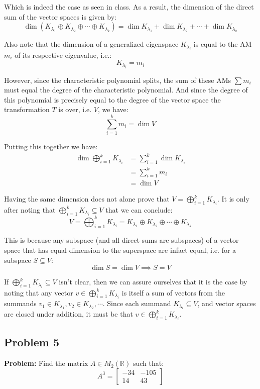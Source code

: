 \documentclass{article}
\begin{document}
Which is indeed the case as seen in class. As a result, the dimension of the direct sum of the vector spaces is given by:
$$\operatorname{dim}(K_{\lambda_1}\oplus K_{\lambda_2}\oplus\cdots\oplus K_{\lambda_k})=\operatorname{dim}K_{\lambda_1}+\operatorname{dim}K_{\lambda_2}+\cdots+\operatorname{dim}K_{\lambda_k}$$

Also note that the dimension of a generalized eigenspace $K_{\lambda_i}$ is equal to the AM $m_i$ of its respective eigenvalue, i.e.:
$$K_{\lambda_i}=m_i$$

However, since the characteristic polynomial splits, the sum of these AMs $\sum m_i$ must equal the degree of the characteristic polynomial. And since the degree of this polynomial is precisely equal to the degree of the vector space the transformation $T$ is over, i.e. $V$, we have:
$$\sum_{i=1}^k m_i=\operatorname{dim}V$$

Putting this together we have:
\begin{align*}
  \operatorname{dim}\bigoplus_{i=1}^k K_{\lambda_i}&=\sum_{i=1}^k\operatorname{dim}K_{\lambda_i}\tag{dimension of direct sum}\\
  &=\sum_{i=1}^k m_i\tag{dim of generalized eigenspace}\\
  &=\operatorname{dim}V\tag{char. polynomial splits}
\end{align*}

Having the same dimension does not alone prove that $V=\bigoplus_{i=1}^k K_{\lambda_i}$. It is only after noting that $\bigoplus_{i=1}^k K_{\lambda_i}\subseteq V$ that we can conclude:
$$V=\bigoplus_{i=1}^k K_{\lambda_i}=K_{\lambda_1}\oplus K_{\lambda_2}\oplus\cdots\oplus K_{\lambda_k}$$

This is because any subspace (and all direct sums are subspaces) of a vector space that has equal dimension to the superspace are infact equal, i.e. for a subspace $S\subseteq V$:
$$\operatorname{dim}S=\operatorname{dim}V\implies S=V$$ 

If $\bigoplus_{i=1}^k K_{\lambda_i}\subseteq V$ isn't clear, then we can assure ourselves that it is the case by noting that any vector $v\in\bigoplus_{i=1}^k K_{\lambda_i}$ is itself a sum of vectors from the summands $v_1\in K_{\lambda_1},v_2\in K_{\lambda_2},\cdots$. Since each summand $K_{\lambda_i}\subseteq V$, and vector spaces are closed under addition, it must be that $v\in\bigoplus_{i=1}^k K_{\lambda_i}$.
\bigskip
\newpage

\subsection*{Problem 5}
\noindent\textbf{Problem:} Find the matrix $A\in M_2(\mathbb R)$ such that:
$$A^3=\begin{bmatrix}
  -34&-105\\14&43
\end{bmatrix}$$
\smallskip
\end{document}
